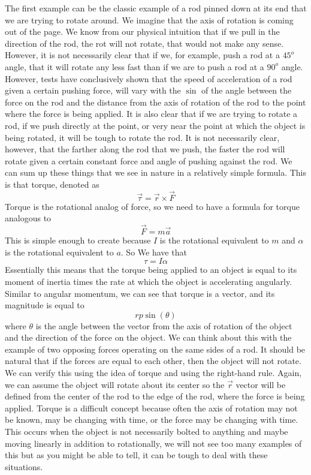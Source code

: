 The first example can be the classic example of a rod pinned down at its end that we are trying to rotate around. We imagine that the axis of rotation is coming out of the page.  We know from our physical intuition that if we pull in the direction of the rod, the rot will not rotate, that would not make any sense. However, it is not necessarily clear that if we, for example, push a rod at a $45^o$ angle, that it will rotate any less fast than if we are to push a rod at a $90^o$ angle. However, tests have conclusively shown that the speed of acceleration of a rod given a certain pushing force, will vary with the $\sin$ of the angle between the force on the rod and the distance from the axis of rotation of the rod to the point where the force is being applied. It is also clear that if we are trying to rotate a rod, if we push directly at the point, or very near the point at which the object is being rotated, it will be tough to rotate the rod. It is not necessarily clear, however, that the farther along the rod that we push, the faster the rod will rotate given a certain constant force and angle of pushing against the rod. We can sum up these things that we see in nature in a relatively simple formula. This is that torque, denoted as \begin{equation}\vec{\tau}= \vec{r} \times \vec{F}\end{equation} Torque is the rotational analog of force, so we need to have a formula for torque analogous to $$\vec{F}=m\vec{a}$$ This is simple enough to create because $I$ is the rotational equivalent to $m$ and $\alpha$ is the rotational equivalent to $a$. So We have that $$\tau=I \alpha$$ Essentially this means that the torque being applied to an object is equal to its moment of inertia times the rate at which the object is accelerating angularly. Similar to angular momentum, we can see that torque is a vector, and its magnitude is equal to $$rp\sin\left(\theta \right)$$ where $\theta$ is the angle between the vector from the axis of rotation of the object and the direction of the force on the object. We can think about this with the example of two opposing forces operating on the same sides of a rod. It should be natural that if the forces are equal to each other, then the object will not rotate. We can verify this using the idea of torque and using the right-hand rule. Again, we can assume the object will rotate about its center so the $\vec{r}$ vector will be defined from the center of the rod to the edge of the rod, where the force is being applied. Torque is a difficult concept because often the axis of rotation may not be known, may be changing with time, or the force may be changing with time. This occurs when the object is not necessarily bolted to anything and maybe moving linearly in addition to rotationally, we will not see too many examples of this but as you might be able to tell, it can be tough to deal with these situations.
